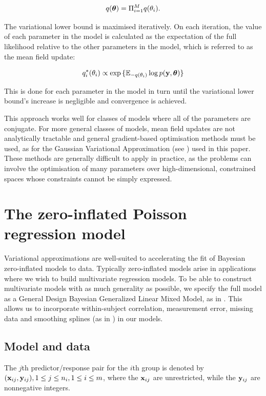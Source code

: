\documentclass{article}[12pt]
\begin{document}
$$q({\boldsymbol \theta}) = \Pi_{i=1}^M q(\theta_i).$$

The variational lower bound is maximised iteratively. On each iteration, the value of each parameter in the
model is calculated as the expectation of the full likelihood relative to the other parameters in the model,
which is referred to as the mean field update:

$$q_i^*(\theta_i) \propto \exp{\{ {\mathbb E}_{-q(\theta_i)} \log p({\bf y}, {\boldsymbol\theta}) \}}$$

This is done for each parameter in the model in turn until the variational lower bound's increase is
negligible and convergence is achieved.

This approach works well for classes of models where all of the parameters are conjugate. For more general
classes of models, mean field updates are not analytically tractable and general gradient-based optimisation
methods must be used, as for the Gaussian Variational Approximation (see \cite{ormerod09}) used in this paper.
These methods are generally difficult to apply in practice, as the problems can involve the optimisation of
many parameters over high-dimensional, constrained spaces whose constraints cannot be simply expressed.

\section{The zero-inflated Poisson regression model}
\label{sec:model_and_data}

Variational approximations are well-suited to accelerating the fit of Bayesian zero-inflated models to data.
Typically zero-inflated models arise in applications where we wish to build multivariate regression models. To
be able to construct multivariate models with as much generality as possible, we specify the full model as a
General Design Bayesian Generalized Linear Mixed Model, as in \citep{zhao06}. This allows us to incorporate
within-subject correlation, measurement error, missing data and smoothing splines (as in \cite{Wand2008}) in
our models.


\subsection{Model and data}

The $j$th predictor/response pair for the $i$th group is denoted by $({\bf x}_{ij}, {\bf y}_{ij}), 1 \leq j \leq n_i,
1 \leq i \leq m$, where the ${\bf x}_{ij}$ are unrestricted, while the ${\bf y}_{ij}$ are nonnegative integers.
\end{document}
